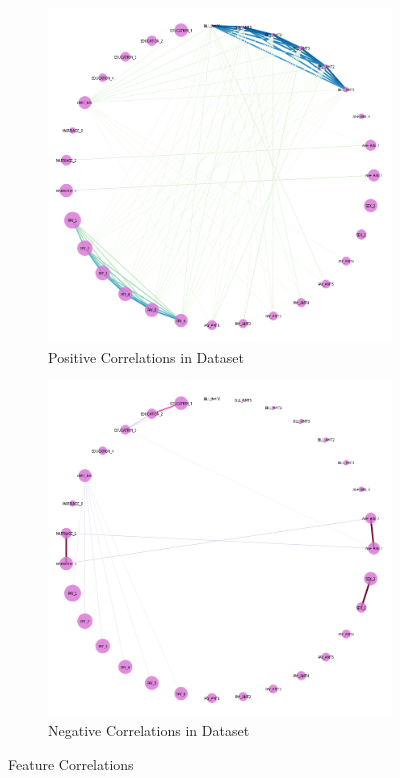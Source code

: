 \documentclass{article}
\begin{document}
\begin{figure}[ht]
	\centering
	\begin{subfigure}{.5\textwidth}
		\centering
		\includegraphics[width=.8\linewidth]{pos_corr}
		\caption{Positive Correlations in Dataset}
		\label{fig:pos_corr}
	\end{subfigure}%
	\begin{subfigure}{.5\textwidth}
		\centering
		\includegraphics[width=.8\linewidth]{neg_corr}
		\caption{Negative Correlations in Dataset}
		\label{fig:neg_corr}
	\end{subfigure}
	\label{fig:corr}
	\caption{Feature Correlations}
\end{figure}
\end{document}
